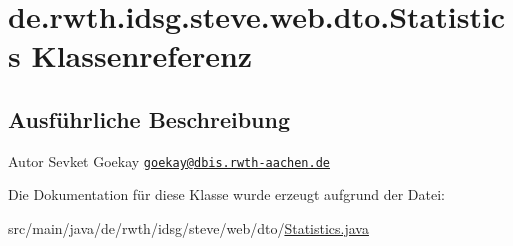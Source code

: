 \hypertarget{classde_1_1rwth_1_1idsg_1_1steve_1_1web_1_1dto_1_1_statistics}{\section{de.\+rwth.\+idsg.\+steve.\+web.\+dto.\+Statistics Klassenreferenz}
\label{classde_1_1rwth_1_1idsg_1_1steve_1_1web_1_1dto_1_1_statistics}
}


\subsection{Ausführliche Beschreibung}
\begin{DoxyAuthor}{Autor}
Sevket Goekay \href{mailto:goekay@dbis.rwth-aachen.de}{\tt goekay@dbis.\+rwth-\/aachen.\+de} 
\end{DoxyAuthor}


Die Dokumentation für diese Klasse wurde erzeugt aufgrund der Datei\+:\begin{DoxyCompactItemize}
\item 
src/main/java/de/rwth/idsg/steve/web/dto/\hyperlink{_statistics_8java}{Statistics.\+java}\end{DoxyCompactItemize}
